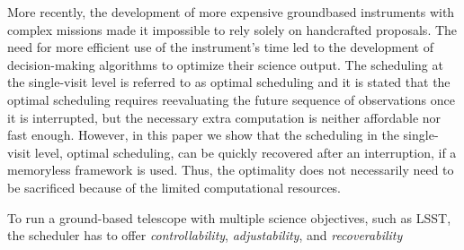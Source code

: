 \documentclass{article}
\begin{document}
More recently, the development of more expensive groundbased instruments with complex missions made it impossible to
rely solely on handcrafted proposals. The need for more
efficient use of the instrument’s time led to the development of decision-making algorithms to optimize their science output.
The scheduling at the single-visit level is referred to as optimal scheduling and it is
stated that the optimal scheduling requires reevaluating the
future sequence of observations once it is interrupted, but the
necessary extra computation is neither affordable nor fast
enough. However, in this paper we show that the scheduling in
the single-visit level, optimal scheduling, can be quickly
recovered after an interruption, if a memoryless framework is
used. Thus, the optimality does not necessarily need to be
sacrificed because of the limited computational resources.

To run a ground-based telescope with multiple science
objectives, such as LSST, the scheduler has to offer
\textit{controllability}, \textit{adjustability}, and \textit{recoverability}

\printbibliography
\end{document}
